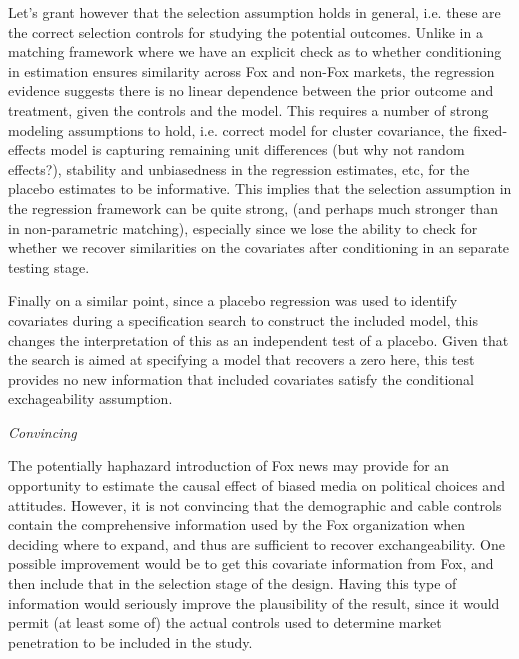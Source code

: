 \documentclass{article}
\begin{document}
\begin{itemize}
\begin{itemize}
\vspace{1em}

Let's grant however that the selection assumption holds in general,
i.e. these are the correct selection controls for studying the
potential outcomes.  Unlike in a matching framework where we have an
explicit check as to whether conditioning in estimation ensures
similarity across Fox and non-Fox markets, the regression evidence
suggests there is no linear dependence between the prior outcome and
treatment, given the controls and the model.  This requires a number
of strong modeling assumptions to hold, i.e. correct model for cluster
covariance, the fixed-effects model is capturing remaining unit
differences (but why not random effects?), stability and unbiasedness
in the regression estimates, etc, for the placebo estimates to be
informative.  This implies that the selection assumption in the
regression framework can be quite strong, (and perhaps much stronger
than in non-parametric matching), especially since we lose the ability
to check for whether we recover similarities on the covariates after
conditioning in an separate testing stage. 
 \vspace{1em}

 Finally on a similar point, since a placebo regression was used to
 identify covariates during a specification search to construct the
 included model, this changes the interpretation of this as an
 independent test of a placebo.  Given that the search is aimed at
 specifying a model that recovers a zero here, this test provides no
 new information that included covariates satisfy the conditional
 exchageability assumption.  \vspace{1em}


{\em Convincing}
\vspace{1em}

The potentially haphazard introduction of Fox news may provide for an
opportunity to estimate the causal effect of biased media on political
choices and attitudes. However, it is not convincing that the
demographic and cable controls contain the comprehensive information
used by the Fox organization when deciding where to expand, and thus
are sufficient to recover exchangeability.  One possible improvement
would be to get this covariate information from Fox, and then include
that in the selection stage of the design.  Having this type of
information would seriously improve the plausibility of the result,
since it would permit (at least some of) the actual controls used to
determine market penetration to be included in the study.  \vspace{1em}


\end{itemize}
\end{itemize}
\end{document}
